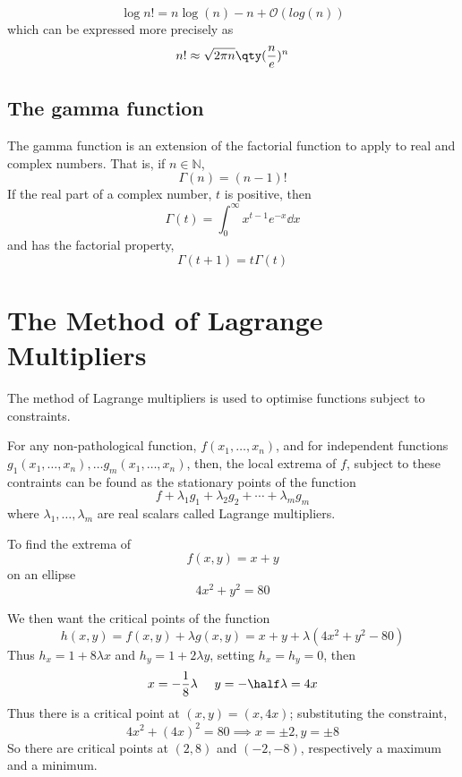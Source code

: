 \begin{equation}
  \label{eq:1}
  \log{n!} = n \log(n) - n + \mathcal{O}(log(n))
\end{equation}
which can be expressed more precisely as
\begin{equation}
  \label{eq:2}
  n! \approx \sqrt{2 \pi n} \qty( \frac{n}{e} )^n 
\end{equation}

\subsection{The gamma function}
\label{sec:gamma-function}

The gamma function is an extension of the factorial function to apply
to real and complex numbers. That is, if $n \in \mathbb{N}$,
\[\Gamma(n) = (n-1)! \]
If the real part of a complex number, $t$ is positive, then
\begin{equation}
  \label{eq:3}
  \Gamma(t) = \int_0^{\infty} x^{t-1} e^{-x} \dd{x}
\end{equation}
and has the factorial property,
\begin{equation}
  \label{eq:4}
  \Gamma(t+1) = t \Gamma(t)
\end{equation}

\section{The Method of Lagrange Multipliers}
\label{sec:meth-lagr-mult}

The method of Lagrange multipliers is used to optimise functions
subject to constraints. 

\begin{theorem}
  For any non-pathological function, $f(x_1, \dots, x_n)$, and for
  independent functions $g_1(x_1, \dots, x_n), \dots g_m(x_1, \dots,
  x_n)$, then, the local extrema of $f$, subject to these contraints
  can be found as the stationary points of the function
  \[ f + \lambda_1 g_1 + \lambda_2 g_2 + \cdots + \lambda_m g_m \]
  where $\lambda_1, \dots, \lambda_m$ are real scalars called Lagrange
  multipliers.
\end{theorem}

\begin{example}
  To find the extrema of 
\[ f(x,y) = x+y \]
on an ellipse \[ 4x^2 + y^2 = 80 \]

We then want the critical points of the function 
\begin{equation*} 
h(x, y) = f(x,y) + \lambda g(x,y) = x+y + \lambda (4 x^2 + y^2 -80) 
\end{equation*}
Thus $h_x= 1+8 \lambda x$ and $h_y = 1+ 2 \lambda y$, setting $h_x =
h_y =0$, then
\[ x = - \frac{1}{8} \lambda\ \quad y = - \half \lambda = 4x\] Thus
there is a critical point at $(x,y)=(x, 4x)$; substituting the
constraint,
\[ 4x^2 + (4x)^2 = 80 \implies x = \pm 2, y = \pm 8 \] So there are
critical points at $(2,8)$ and $(-2, -8)$, respectively a maximum and
a minimum.
\end{example}

